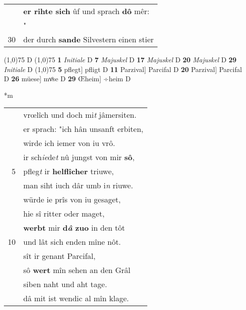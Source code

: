 \documentclass[8pt,a4paper,notitlepage]{article}
\begin{document}
\begin{table}[ht]
\begin{minipage}[t]{0.5\linewidth}
\begin{tabular}{rl}
 & \textbf{er rihte sich} ûf und sprach \textbf{dô} mêr:\\ 
 & "\textit{\begin{large}Œ\end{large}}heim, waz wirret dir?"\\ 
30 & der durch \textbf{sande} Silvestern einen stier\\ 
\end{tabular}
\scriptsize
\line(1,0){75} \newline
D \newline
\line(1,0){75} \newline
\textbf{1} \textit{Initiale} D  \textbf{7} \textit{Majuskel} D  \textbf{17} \textit{Majuskel} D  \textbf{20} \textit{Majuskel} D  \textbf{29} \textit{Initiale} D  \newline
\line(1,0){75} \newline
\textbf{5} pflegt] pfligt D \textbf{11} Parzival] Parcifal D \textbf{20} Parzival] Parcifal D \textbf{26} müese] mvͦse D \textbf{29} Œheim] ÷heim D \newline
\end{minipage}
\hspace{0.5cm}
\begin{minipage}[t]{0.5\linewidth}
\small
\begin{center}*m
\end{center}
\begin{tabular}{rl}
 & vrœlîch und doch mi\textit{t} jâmersiten.\\ 
 & er sprach: "ich hân unsanft erbiten,\\ 
 & wirde ich iemer von iu vrô.\\ 
 & ir sch\textit{ie}de\textit{t} nû jungst von mir \textbf{sô},\\ 
5 & pfleg\textit{t} ir \textbf{helflîcher} triuwe,\\ 
 & man siht iuch dâr umb i\textit{n} riuwe.\\ 
 & würde ie prîs von iu gesaget,\\ 
 & hie sî ritter oder maget,\\ 
 & \textbf{werbt} mir \textbf{d\textit{â} zuo} in den tôt\\ 
10 & und lât sich enden mîne nôt.\\ 
 & sît ir genant Parcifal,\\ 
 & sô \textbf{wert} mîn sehen an den Grâl\\ 
 & siben naht und aht tage.\\ 
 & dâ mit ist wendic al mîn klage.\\ 

\end{tabular}
\end{minipage}
\end{table}
\end{document}
